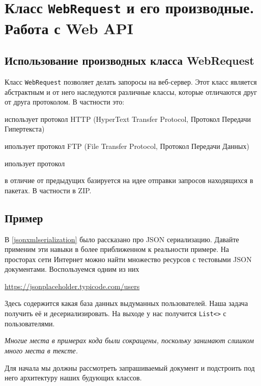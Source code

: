 \section{Класс \texttt{WebRequest} и его производные. Работа с Web API} 
\subsection{Использование производных класса WebRequest}
Класс \texttt{WebRequest} позволяет делать запоросы на веб-сервер. Этот класс является абстрактным и от него наследуются различные классы, которые отличаются друг от друга протоколом. В частности это: 

\begin{description}[style=nextline]
\item [\texttt{System.Net.HttpWebRequest}] использует протокол HTTP (HyperText Transfer Protocol, Протокол Передачи Гипертекста)
\item [\texttt{System.Net.FtpWebRequest}]
ипользует протокол FTP (File Transfer Protocol, Протокол Передачи Данных)
\item [\texttt{System.Net.FileWebRequest}]
ипользует протокол 
\item [\texttt{System.IO.Packaging.PackWebRequest}] в отличие от предыдущих базируется на идее отправки запросов находящихся в пакетах. В частности в ZIP.
\end{description}

\subsection{Пример} \label{webrequest} 

В \ref{jsonxmlserialization} было рассказано про JSON сериализацию. Давайте применим эти навыки в более приближенном к реальности примере. На просторах сети Интернет можно найти множество ресурсов с тестовыми JSON документами. Воспользуемся одним из них

\url{https://jsonplaceholder.typicode.com/users}

Здесь содержится какая база данных выдуманных пользователей. Наша задача получить её и десериализировать. На выходе у нас получится \texttt{List<>} с пользователями.

\textit{Многие места в примерах кода были сокращены, поскольку занимают слишком много места в тексте.}

Для начала мы должны рассмотреть запрашиваемый документ и подстроить под него архитектуру наших будующих классов. 

